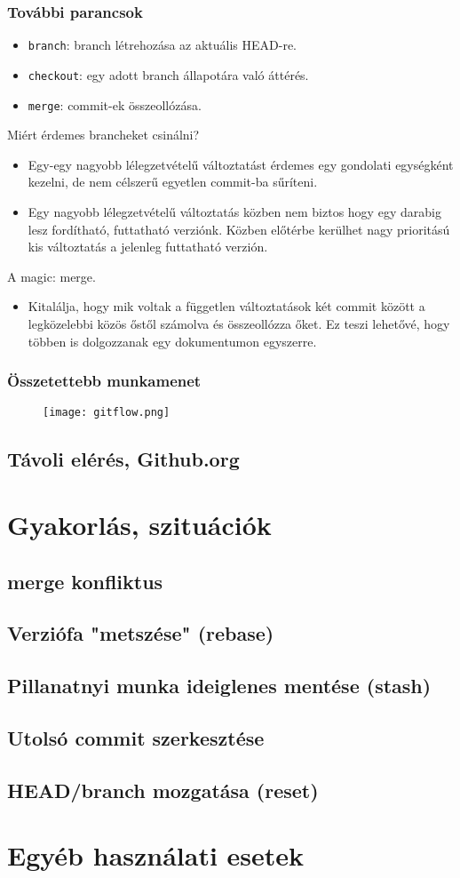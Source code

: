 	\begin{frame}
	  \frametitle{További parancsok}
	  \begin{itemize}
	    \item \lstinline|branch|: branch létrehozása az aktuális HEAD-re.
	    \item \lstinline|checkout|: egy adott branch állapotára való áttérés.
	    \item \lstinline|merge|: commit-ek összeollózása.
	  \end{itemize}
	  Miért érdemes brancheket csinálni?
	  \begin{itemize}
	    \item Egy-egy nagyobb lélegzetvételű változtatást érdemes egy gondolati egységként kezelni, de nem célszerű egyetlen commit-ba sűríteni.
	    \item Egy nagyobb lélegzetvételű változtatás közben nem biztos hogy egy darabig lesz fordítható, futtatható verziónk. Közben előtérbe kerülhet nagy prioritású kis változtatás a jelenleg futtatható verzión.
	  \end{itemize}
	  A \git magic: merge.
	  \begin{itemize}
	    \item{Kitalálja, hogy mik voltak a független változtatások két commit között a legközelebbi közös őstől számolva és összeollózza őket.
	      Ez teszi lehetővé, hogy többen is dolgozzanak egy dokumentumon egyszerre.}
	  \end{itemize}
	\end{frame}
	\begin{frame}
	  \frametitle{Összetettebb munkamenet}
	  \begin{figure}
	    \centering
	    \texttt{[image: gitflow.png]}
	  \end{figure}
	\end{frame}
	\subsection{Távoli elérés, Github.org}

\section{Gyakorlás, szituációk}
	\subsection{merge konfliktus}
	\subsection{Verziófa "metszése" (rebase)}
	\subsection{Pillanatnyi munka ideiglenes mentése (stash)}
	\subsection{Utolsó commit szerkesztése}
	\subsection{HEAD/branch mozgatása (reset)}

\section{Egyéb használati esetek}



